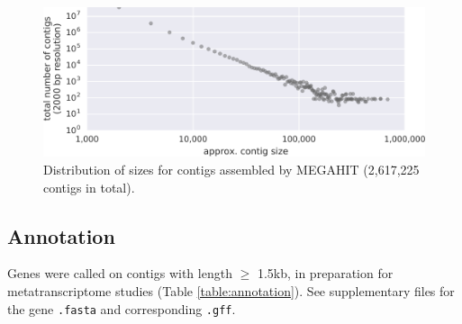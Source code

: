 \begin{figure}[H]
\centering
    \includegraphics[width=1.0\textwidth]{./tex/chapter2/figures/170123_frac_reads_binned_at_different_contig_lengths_and_total--INKSCAPED.pdf}
    \begin{singlespace}
    \caption[Distribution of contig sizes]{
        Distribution of sizes for contigs assembled by MEGAHIT (2,617,225 contigs in total).}
    \label{fig:contig_lengths}
    \end{singlespace}
\end{figure}



\subsection{Annotation}



Genes were called on contigs with length $\geq$ 1.5kb, in preparation for metatranscriptome studies (Table \ref{table:annotation}).
See supplementary files for the gene \texttt{.fasta} and corresponding \texttt{.gff}. %

